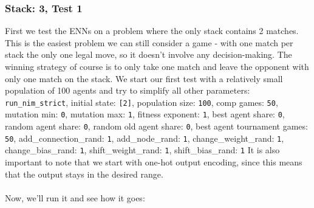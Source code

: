 \documentclass[11pt]{report}
\begin{document}
\begin{enumerate}
                \subsubsection{Stack: 3, Test 1}
    First we test the ENNs on a problem where the only stack contains 2 matches.
    This is the easiest problem we can still consider a game - with one match per stack the only one legal move, so it doesn't involve any decision-making.
    The winning strategy of course is to only take one match and leave the opponent with only one match on the stack.
    We start our first test with a relatively small population of 100 agents and try to simplify all other parameters:
    \\
    \texttt{run\_nim\_strict}, initial state: \texttt{[2]}, population size: \texttt{100}, comp games: \texttt{50}, mutation min: \texttt{0}, mutation max: \texttt{1}, fitness exponent: \texttt{1}, best agent share:
    \texttt{0}, random agent share: \texttt{0}, random old agent share: \texttt{0}, best agent tournament games: \texttt{50}, add\_connection\_rand: \texttt{1}, add\_node\_rand: \texttt{1}, change\_weight\_rand: \texttt{1}, change\_bias\_rand: \texttt{1}, shift\_weight\_rand: \texttt{1}, shift\_bias\_rand: \texttt{1}
    It is also important to note that we start with one-hot output encoding, since this means that the output stays in the desired range.
    \\ \\
    Now, we'll run it and see how it goes:
    \\
    \newcommand{\csvpath}{../data/simple_nim/stack_2/t_1/stats.csv} %
    \begin{center}
\end{center}
\end{enumerate}
\end{document}
